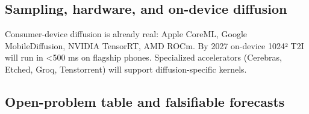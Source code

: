 \subsection{Sampling, hardware, and on-device diffusion}\label{sampling-hardware-and-on-device-diffusion}

Consumer-device diffusion is already real: Apple CoreML, Google MobileDiffusion, NVIDIA TensorRT, AMD ROCm. By 2027 on-device 1024² T2I will run in \textless500 ms on flagship phones. Specialized accelerators (Cerebras, Etched, Groq, Tenstorrent) will support diffusion-specific kernels.

\subsection{Open-problem table and falsifiable forecasts}\label{open-problem-table-and-falsifiable-forecasts}

